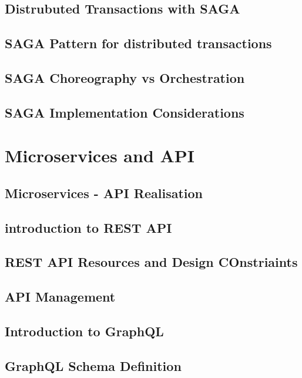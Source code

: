 \documentclass[a4paper, 11pt]{book}
\begin{document}
    \section{Distrubuted Transactions with SAGA}


    \section{SAGA Pattern for distributed transactions}


    \section{SAGA Choreography vs Orchestration}


    \section{SAGA Implementation Considerations}


    \chapter{Microservices and API}


    \section{Microservices - API Realisation}


    \section{introduction to REST API}


    \section{REST API Resources and Design COnstriaints}


    \section{API Management}


    \section{Introduction to GraphQL}


    \section{GraphQL Schema Definition}
\end{document}
